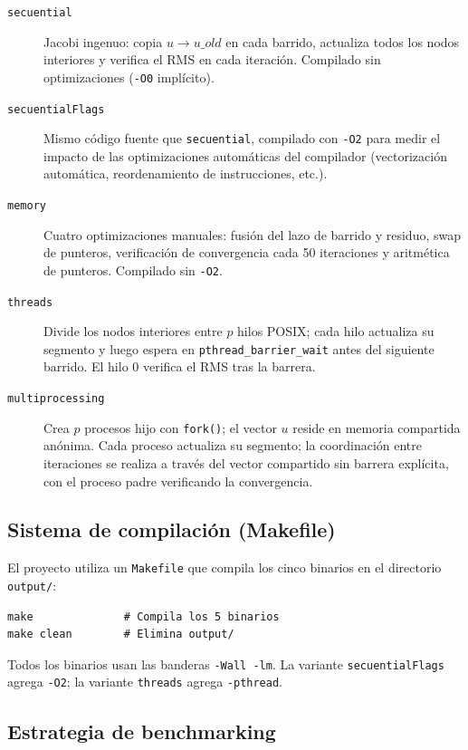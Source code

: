 \documentclass{article}
\begin{document}
\begin{description}
  \item[\texttt{secuential}] Jacobi ingenuo: copia $u \to u\_old$ en cada
    barrido, actualiza todos los nodos interiores y verifica el RMS en cada
    iteración.  Compilado sin optimizaciones (\texttt{-O0} implícito).
  \item[\texttt{secuentialFlags}] Mismo código fuente que \texttt{secuential},
    compilado con \texttt{-O2} para medir el impacto de las optimizaciones
    automáticas del compilador (vectorización automática, reordenamiento de
    instrucciones, etc.).
  \item[\texttt{memory}] Cuatro optimizaciones manuales: fusión del lazo de
    barrido y residuo, swap de punteros, verificación de convergencia cada 50
    iteraciones y aritmética de punteros.  Compilado sin \texttt{-O2}.
  \item[\texttt{threads}] Divide los nodos interiores entre $p$ hilos POSIX;
    cada hilo actualiza su segmento y luego espera en
    \texttt{pthread\_barrier\_wait} antes del siguiente barrido.  El hilo 0
    verifica el RMS tras la barrera.
  \item[\texttt{multiprocessing}] Crea $p$ procesos hijo con \texttt{fork()};
    el vector $u$ reside en memoria compartida anónima.  Cada proceso actualiza
    su segmento; la coordinación entre iteraciones se realiza a través del
    vector compartido sin barrera explícita, con el proceso padre verificando la
    convergencia.
\end{description}

\subsection{Sistema de compilación (Makefile)}

El proyecto utiliza un \texttt{Makefile} que compila los cinco binarios en el directorio \texttt{output/}:

\begin{verbatim}
make              # Compila los 5 binarios
make clean        # Elimina output/
\end{verbatim}

Todos los binarios usan las banderas \texttt{-Wall -lm}.  La variante
\texttt{secuentialFlags} agrega \texttt{-O2}; la variante \texttt{threads}
agrega \texttt{-pthread}.

\subsection{Estrategia de benchmarking}
\end{document}
